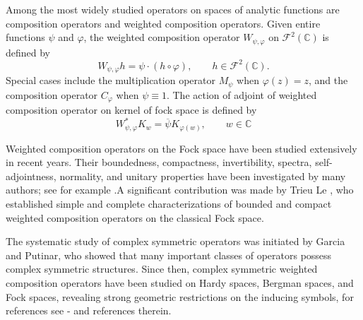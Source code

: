 \documentclass[reqno]{amsart}
\theoremstyle{remark}
\theoremstyle{Definition}
\theoremstyle{remark}
\numberwithin{equation}{section}
\begin{document}
Among the most widely studied operators on spaces of analytic functions are composition operators and weighted composition operators. Given entire functions $\psi$ and $\varphi$, the weighted composition operator $W_{\psi,\varphi}$ on $\mathcal{F}^{2}(\mathbb{C})$ is defined by
\begin{equation*}
W_{\psi,\varphi}h
=
\psi\cdot(h\circ\varphi),
\qquad h\in\mathcal{F}^{2}(\mathbb{C}).
\end{equation*}
Special cases include the multiplication operator $M_{\psi}$ when $\varphi(z)=z$, and the composition operator $C_{\varphi}$ when $\psi\equiv1$.
The action of adjoint of weighted composition operator on kernel of fock space is defined by
\begin{equation}\label{1}
    W^{*}_{\psi,\varphi}K_{w}=\overline{\psi} K_{\varphi(w)},\qquad w\in \mathbb{C}
\end{equation}


Weighted composition operators on the Fock space have been studied extensively in recent years. Their boundedness, compactness, invertibility, spectra, self-adjointness, normality, and unitary properties have been investigated by many authors; see for example \cite{GH,PVL,PVL2,TL,TL1,NST,LZ1,LZ2,LZ3}.A significant contribution was made by Trieu Le \cite{TL1}, who established simple and complete characterizations of bounded and compact weighted composition operators on the classical Fock space.


The systematic study of complex symmetric operators was initiated by Garcia and Putinar\cite{GP1}, who showed that many important classes of operators possess complex symmetric structures. Since then, complex symmetric weighted composition operators have been studied on Hardy spaces, Bergman spaces, and Fock spaces, revealing strong geometric restrictions on the inducing symbols, for references see \cite{GP1}-\cite{NST} and references therein.
\end{document}
